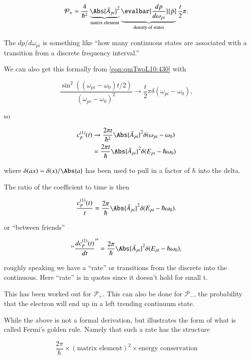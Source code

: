\begin{equation}\label{eqn:qmTwoL10:470}
\mathcal{P}_{+} 
=
\frac{4}{\hbar^2}
\underbrace{
\Abs{
\bar{A}_{pi}
}^2 
}_{\text{matrix element}}
\underbrace{\evalbar{\frac{dp}{d\omega_{pi}}}{\bar{p}}}_{\text{density of states}}
\frac{t}{2} \pi.
\end{equation}

The $dp/d\omega_{pi}$ is something like ``how many continuous states are associated with a transition from a discrete frequency interval.''

We can also get this formally from \ref{eqn:qmTwoL10:430} with

\begin{equation}\label{eqn:qmTwoL10:490}
\frac{
\sin^2\left( (\omega_{pi} - \omega_0) t/2 \right)
}{
\left( \omega_{pi} - \omega_0 \right)^2
}
\rightarrow 
\frac{t}{2} \pi \delta(\omega_{pi} - \omega_0),
\end{equation}

so

\begin{equation}\label{eqn:qmTwoL10:510}
\begin{aligned}
c_p^{(1)}(t) 
&\rightarrow \frac{2 \pi t}{\hbar^2} 
\Abs{
\bar{A}_{pi}
}^2 
\delta(\omega_{pi} - \omega_0) \\
&=
\frac{2 \pi t}{\hbar} 
\Abs{
\bar{A}_{pi}
}^2 
\delta(E_{pi} - \hbar \omega_0)
\end{aligned}
\end{equation}

where $\delta(ax) = \delta(x)/\Abs{a}$ has been used to pull in a factor of $\hbar$ into the delta.

The ratio of the coefficient to time is then

\begin{equation}\label{eqn:qmTwoL10:530}
\frac{c_p^{(1)}(t) }{t}
=
\frac{2 \pi}{\hbar} 
\Abs{
\bar{A}_{pi}
}^2 
\delta(E_{pi} - \hbar \omega_0).
\end{equation}

or ``between friends''

\begin{equation}\label{eqn:qmTwoL10:550}
''\frac{dc_p^{(1)}(t) }{dt}''
=
\frac{2 \pi}{\hbar} 
\Abs{
\bar{A}_{pi}
}^2 
\delta(E_{pi} - \hbar \omega_0),
\end{equation}

roughly speaking we have a ``rate'' or transitions from the discrete into the continuous.  Here ``rate'' is in quotes since it doesn't hold for small t.

This has been worked out for $\mathcal{P}_{+}$.  This can also be done for $\mathcal{P}_{-}$, the probability that the electron will end up in a left trending continuum state.

While the above is not a formal derivation, but illustrates the form of what is called Fermi's golden rule.  Namely that such a rate has the structure

\begin{equation}\label{eqn:qmTwoL10:570}
\frac{2 \pi}{\hbar} \times (\text{matrix element})^2 \times \text{energy conservation}
\end{equation}

\EndArticle
